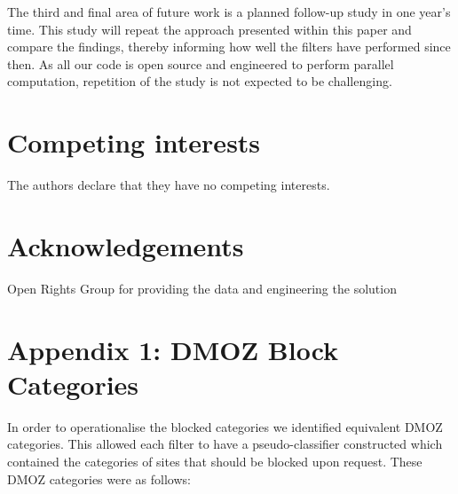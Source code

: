 \documentclass{bmcart}
\begin{document}
The third and final area of future work is a planned follow-up study in one year's time.
This study will repeat the approach presented within this paper and compare the findings, thereby informing how well the filters have performed since then.
As all our code is open source and engineered to perform parallel computation, repetition of the study is not expected to be challenging.


\begin{backmatter}

\section*{Competing interests}
  The authors declare that they have no competing interests.

\section*{Acknowledgements}
Open Rights Group for providing the data and engineering the solution


\section*{Appendix 1: DMOZ Block Categories}
\label{app:cats}
In order to operationalise the blocked categories we identified equivalent DMOZ categories.
This allowed each filter to have a pseudo-classifier constructed which contained the categories of sites that should be blocked upon request.
These DMOZ categories were as follows:


\end{backmatter}
\end{document}
